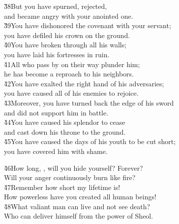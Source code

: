 \begin{poetry}
\poeml \v{38}But you have spurned, rejected, \\
\poemll    and became angry with your anointed one. \\
\poeml \v{39}You have dishonored the covenant with your servant; \\
\poemll    you have defiled his crown on the ground. \\
\poeml \v{40}You have broken through all his walls; \\
\poemll    you have laid his fortresses in ruin. \\
\poeml \v{41}All who pass by on their way plunder him; \\
\poemll    he has become a reproach to his neighbors. \\
\poeml \v{42}You have exalted the right hand of his adversaries; \\
\poemll    you have caused all of his enemies to rejoice. \\
\poeml \v{43}Moreover, you have turned back the edge of his sword \\
\poemll    and did not support him in battle. \\
\poeml \v{44}You have caused his splendor to cease \\
\poemll    and cast down his throne to the ground. \\
\poeml \v{45}You have caused the days of his youth to be cut short; \\
\poemll    you have covered him with shame.
\end{poetry}

\begin{poetry}
\poeml \v{46}How long, , will you hide yourself? Forever? \\
\poemll    Will your anger continuously burn like fire? \\
\poeml \v{47}Remember how short my lifetime is! \\
\poemll    How powerless have you created all human beings! \\
\poeml \v{48}What valiant man can live and not see death? \\
\poemll    Who can deliver himself from the power of Sheol.
\end{poetry}


